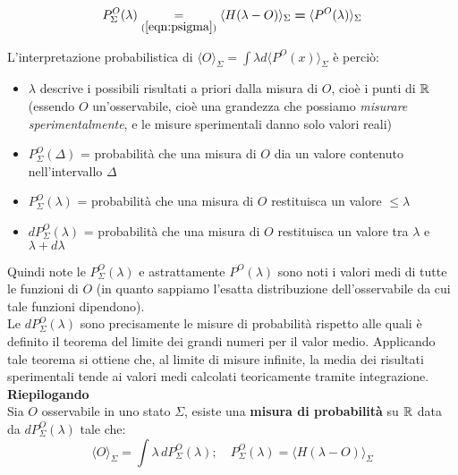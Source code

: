 \documentclass[FisicaTeorica.tex]{subfiles}
\begin{document}
\[
P_\Sigma^O(\lambda) \underset{(\ref{eqn:psigma})}{=} \langle H(\lambda-O)\rangle_\Sigma \bm{=} \langle P^O(\lambda)\rangle_\Sigma
\]
\begin{comment}
È naturale allora definire l'osservabile 
$P^O\left(\lambda\right)=H(\lambda -O)$, che quindi vale $1$ se $O<\lambda$ e $0$ altrimenti.\\
Allora $\langle f(O)\rangle_\Sigma = \int f(\lambda) d\langle P^O (\lambda)\rangle_\Sigma$ o formalmente:
\[
f\left(O\right)=\int f\left(\lambda\right)dP^O\left(\lambda\right); \quad O=\int \lambda dP^O\left(\lambda\right)
\]
\end{comment}
L'interpretazione probabilistica di $\langle O \rangle_\Sigma = \int \lambda d\langle P^O(x)\rangle_\Sigma$ è perciò:
\begin{itemize}
    \item $\lambda$ descrive i possibili risultati a priori dalla misura di $O$, cioè i punti di $\mathbb{R}$ (essendo $O$ un'osservabile, cioè una grandezza che possiamo \textit{misurare sperimentalmente}, e le misure sperimentali danno solo valori reali)
    \item $P_\Sigma^O\left(\Delta\right)$ = probabilità che una misura di $O$ dia un valore contenuto nell'intervallo $\Delta$
    \item $P_\Sigma^O\left(\lambda\right)$ = probabilità che una misura di $O$ restituisca un valore $\leq \lambda$
    \item $dP_\Sigma^O\left(\lambda\right)$ = probabilità che una misura di $O$ restituisca un valore tra $\lambda$ e $\lambda + d\lambda$
\end{itemize}
Quindi note le $P_\Sigma^O\left(\lambda\right)$ e astrattamente $P^O\left(\lambda\right)$ sono noti i valori medi di tutte le funzioni di $O$ (in quanto sappiamo l'esatta distribuzione dell'osservabile da cui tale funzioni dipendono).\\
Le $dP_\Sigma^O\left(\lambda\right)$ sono precisamente le misure di probabilità rispetto alle quali è definito il teorema del limite dei grandi numeri per il valor medio. Applicando tale teorema si ottiene che, al limite di misure infinite, la media dei risultati sperimentali tende ai valori medi calcolati teoricamente tramite integrazione.\\

\textbf{Riepilogando}\\
Sia $O$ osservabile in uno stato $\Sigma$, esiste una \textbf{misura di probabilità} su $\mathbb{R}$ data da $dP_\Sigma^O\left(\lambda\right)$ tale che:
\begin{equation}
\langle O \rangle_\Sigma = \int \lambda\,dP_\Sigma^O(\lambda); \quad P_\Sigma^O(\lambda) = \langle H(\lambda-O)\rangle_\Sigma
\label{eqn:valormedio}
\end{equation}
\end{document}
